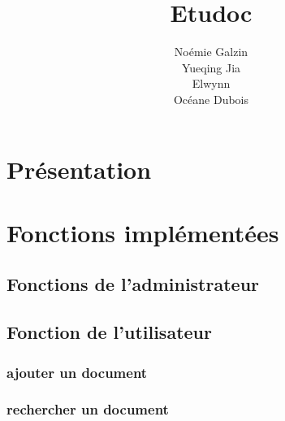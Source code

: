 \documentclass[11pt]{report}
\title{\textbf{Etudoc}}
\author{Noémie Galzin \\
		Yueqing Jia \\
		Elwynn \\
		Océane Dubois}
\date{}
\begin{document}
\maketitle
\newpage
\section{Présentation}


\section{Fonctions implémentées}

\subsection{Fonctions de l'administrateur}

\subsection{Fonction de l'utilisateur}
\subsubsection{ajouter un document}
\subsubsection{rechercher un document}
\end{document}
